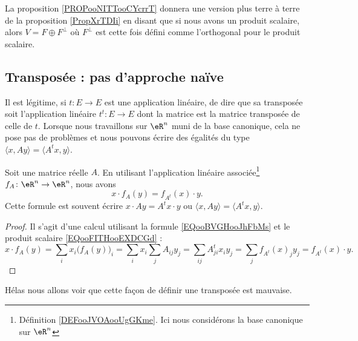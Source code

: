 La proposition \ref{PROPooNITTooCYcrrT} donnera une version plus terre à terre de la proposition \ref{PropXrTDIi} en disant que si nous avons un produit scalaire, alors \( V=F\oplus F^{\perp}\) où \( F^{\perp}\) est cette fois défini comme l'orthogonal pour le produit scalaire.

\subsection{Transposée : pas d'approche naïve}
\label{SUBSECooGPXVooEYwIiJ}

Il est légitime, si \( t\colon E\to E\) est une application linéaire, de dire que sa transposée soit l'application linéaire \( t^t\colon E\to E\) dont la matrice est la matrice transposée de celle de \( t\). Lorsque nous travaillons sur \( \eR^n\) muni de la base canonique, cela ne pose pas de problèmes et nous pouvons écrire des égalités du type \( \langle x, Ay\rangle =\langle A^tx, y\rangle \).

\begin{proposition}     \label{PROPooNARVooEuhweD}
    Soit une matrice réelle \( A\). En utilisant l'application linéaire associée\footnote{Définition \ref{DEFooJVOAooUgGKme}. Ici nous considérons la base canonique sur \( \eR^n\)} \( f_A\colon \eR^n\to \eR^n\), nous avons
    \begin{equation}
        x\cdot f_A(y)=f_{A^t}(x)\cdot y.
    \end{equation}
    Cette formule est souvent écrire \( x\cdot Ay=A^tx\cdot y\) ou \( \langle x, Ay\rangle =\langle A^tx, y\rangle \).
\end{proposition}

\begin{proof}
    Il s'agit d'une calcul utilisant la formule \eqref{EQooBVGHooJhFbMs} et le produit scalaire \eqref{EQooFITHooEXDCGd} :
    \begin{equation}
        x\cdot f_A(y)=\sum_ix_i\big( f_A(y) \big)_i=\sum_ix_i\sum_jA_{ij}y_j=\sum_{ij}A^t_{ji}x_iy_j=\sum_jf_{A^t}(x)_jy_j=f_{A^t}(x)\cdot y.
    \end{equation}
\end{proof}

Hélas nous allons voir que cette façon de définir une transposée est mauvaise.

